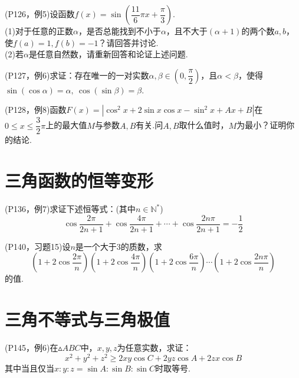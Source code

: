 \documentclass[cn,hazy,black,10pt,normal]{elegantnote}
\newcommand{\ssb}[1]{\left( #1 \right)}
\begin{document}
\newpage
\begin{problem}
	(P126，例5)设函数$f(x)=\sin \ssb{\dfrac{11}{6} \pi x + \dfrac{\pi}{3}}$. \\
	(1)对于任意的正数$\alpha$，是否总能找到不小于$\alpha$，且不大于$(\alpha +1)$的两个数$a,b$，使$f(a)=1,f(b)=-1$？请回答并讨论. \\
	(2)若$\alpha$是任意自然数，请重新回答和论证上述问题.
\end{problem}

\newpage
\begin{problem}
	(P127，例6)求证：存在唯一的一对实数$\alpha ,\beta \in \ssb{0,\dfrac{\pi}{2}}$，且$\alpha < \beta$，使得$\sin (\cos \alpha) = \alpha ,~\cos (\sin \beta ) = \beta$.
\end{problem}

\vspace{27em}

\begin{problem}
	(P128，例8)函数$F(x)=|\cos ^2 x + 2\sin x \cos x - \sin ^2 x + Ax+B|$在$0 \leq x \leq \dfrac{3}{2}\pi$上的最大值$M$与参数$A,B$有关.问$A,B$取什么值时，$M$为最小？证明你的结论.
\end{problem}

\newpage
\section{三角函数的恒等变形}

\begin{problem}
	(P136，例7)求证下述恒等式：(其中$n \in \mathbb{N}^{*}$)$$\cos \frac{2\pi}{2n+1} + \cos \frac{4\pi}{2n+1} + \cdots + \cos \frac{2n\pi}{2n+1} = -\frac{1}{2}$$
\end{problem}

\vspace{23em}

\newpage
\begin{problem}
	(P140，习题15)设$n$是一个大于$3$的质数，求$$\ssb{1+2\cos \frac{2\pi}{n}} \ssb{1+2\cos \frac{4\pi}{n}} \ssb{1+2\cos \frac{6\pi}{n}} \cdots \ssb{1+2\cos \frac{2n\pi}{n}}$$
	的值.
\end{problem}

\vspace{21em}

\section{三角不等式与三角极值}

\begin{problem}
	(P145，例6)在$\vartriangle ABC$中，$x,y,z$为任意实数，求证：$$x^2+y^2+z^2 \geq 2xy\cos C + 2yz\cos A + 2zx \cos B$$
	其中当且仅当$x:y:z=\sin A : \sin B : \sin C$时取等号.
\end{problem}
\end{document}
